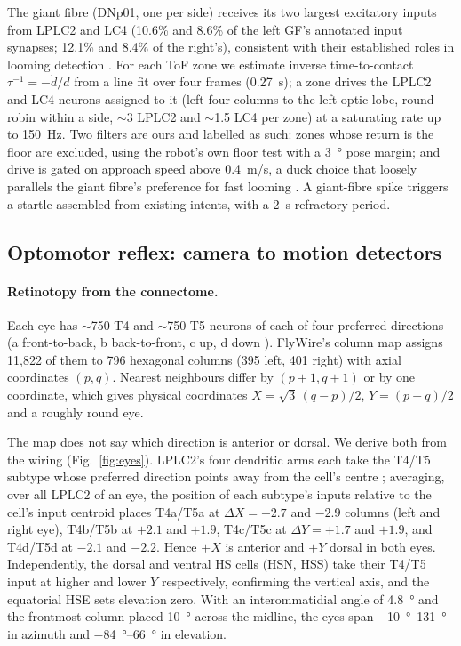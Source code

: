 \documentclass[10pt,a4paper]{article}
\begin{document}
The giant fibre (DNp01, one per side) receives its two largest excitatory inputs from LPLC2 and LC4
(10.6\% and 8.6\% of the left GF's annotated input synapses; 12.1\% and 8.4\% of the right's), consistent
with their established roles in looming detection \cite{vonreyn2017,ache2019,klapoetke2017}. For each ToF
zone we estimate inverse time-to-contact $\tau^{-1} = -\dot d/d$ from a line fit over four frames
(\SI{0.27}{s}); a zone drives the LPLC2 and LC4 neurons assigned to it (left four columns to the left optic
lobe, round-robin within a side, $\sim$3 LPLC2 and $\sim$1.5 LC4 per zone) at a saturating rate up to
\SI{150}{Hz}. Two filters are ours and labelled as such: zones whose return is the floor are excluded,
using the robot's own floor test with a \SI{3}{\degree} pose margin; and drive is gated on approach speed
above \SI{0.4}{m/s}, a duck choice that loosely parallels the giant fibre's preference for fast looming
\cite{vonreyn2017}. A giant-fibre spike triggers a startle assembled from existing intents, with a \SI{2}{s}
refractory period.

\subsection{Optomotor reflex: camera to motion detectors}

\paragraph{Retinotopy from the connectome.} Each eye has $\sim$750 T4 and $\sim$750 T5 neurons of each of
four preferred directions (a front-to-back, b back-to-front, c up, d down \cite{maisak2013}). FlyWire's
column map \cite{matsliah2024} assigns 11{,}822 of them to 796 hexagonal columns (395 left, 401 right)
with axial coordinates $(p,q)$. Nearest neighbours differ by $(p{+}1, q{+}1)$ or by one coordinate, which
gives physical coordinates $X = \sqrt3\,(q-p)/2$, $Y = (p+q)/2$ and a roughly round eye.

The map does not say which direction is anterior or dorsal. We derive both from the wiring
(Fig.~\ref{fig:eyes}). LPLC2's four dendritic arms each take the T4/T5 subtype whose preferred direction
points away from the cell's centre \cite{klapoetke2017}; averaging, over all LPLC2 of an eye, the position
of each subtype's inputs relative to the cell's input centroid places T4a/T5a at $\Delta X = -2.7$ and
$-2.9$ columns (left and right eye), T4b/T5b at $+2.1$ and $+1.9$, T4c/T5c at $\Delta Y = +1.7$ and $+1.9$,
and T4d/T5d at $-2.1$ and $-2.2$. Hence $+X$ is anterior and $+Y$ dorsal in both eyes. Independently, the
dorsal and ventral HS cells (HSN, HSS) take their T4/T5 input at higher and lower $Y$ respectively,
confirming the vertical axis, and the equatorial HSE sets elevation zero. With an interommatidial angle of
\SI{4.8}{\degree} and the frontmost column placed \SI{10}{\degree} across the midline, the eyes span
\SIrange{-10}{131}{\degree} in azimuth and \SIrange{-84}{66}{\degree} in elevation.
\end{document}
